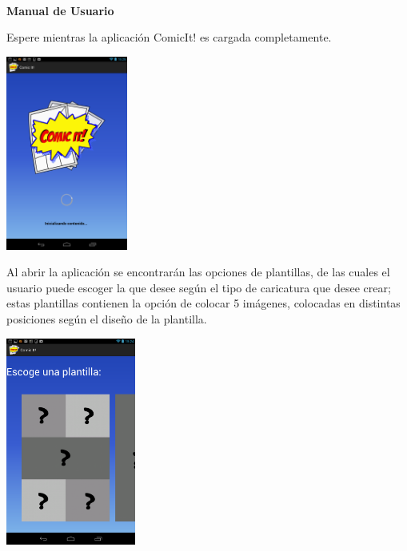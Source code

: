 \documentclass[12pt]{report}
\begin{document}
\newpage

\begin{center}
	\begingroup
		
		\Huge{\textbf{\\Manual de Usuario	\vspace{1em}}}

	\endgroup
\end{center}
Espere mientras la aplicación ComicIt! es cargada completamente.


	\begin{center}
		\begingroup
			\includegraphics[width=0.30\textwidth]{imagenes_usuario/cargar.png}
		\endgroup
	\end{center}



Al abrir la aplicación se encontrarán las opciones de plantillas, de las cuales el usuario puede escoger la que desee según el tipo de caricatura que desee crear; estas plantillas contienen la opción de colocar 5 imágenes, colocadas en distintas posiciones según el diseño de la plantilla.

	\begin{center}
		\begingroup
			\includegraphics[width=0.32\textwidth]{imagenes_usuario/plantillas.png}
		\endgroup
	\end{center}
\end{document}
